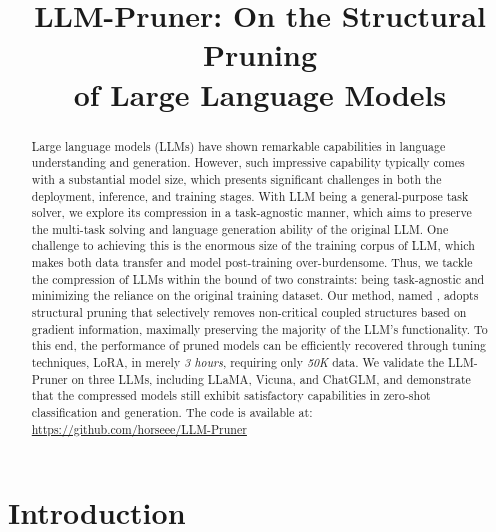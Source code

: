 \title{LLM-Pruner: On the Structural Pruning \\ of Large Language Models}



\maketitle

\begin{abstract}

Large language models (LLMs) have shown remarkable capabilities in language understanding and generation. However, such impressive capability typically comes with a substantial model size, which presents significant challenges in both the deployment, inference, and training stages. With LLM being a general-purpose task solver, we explore its compression in a task-agnostic manner, which aims to preserve the multi-task solving and language generation ability of the original LLM. One challenge to achieving this is the enormous size of the training corpus of LLM, which makes both data transfer and model post-training over-burdensome. Thus, we tackle the compression of LLMs within the bound of two constraints: being task-agnostic and minimizing the reliance on the original training dataset. Our method, named \methodname, adopts structural pruning that selectively removes non-critical coupled structures based on gradient information, maximally preserving the majority of the LLM's functionality. To this end, the performance of pruned models can be efficiently recovered through tuning techniques, LoRA, in merely \emph{3 hours}, requiring only \emph{50K} data. We validate the LLM-Pruner on three LLMs, including LLaMA, Vicuna, and ChatGLM, and demonstrate that the compressed models still exhibit satisfactory capabilities in zero-shot classification and generation. The code is available at: {\url{https://github.com/horseee/LLM-Pruner}} 

\end{abstract}

\section{Introduction}

